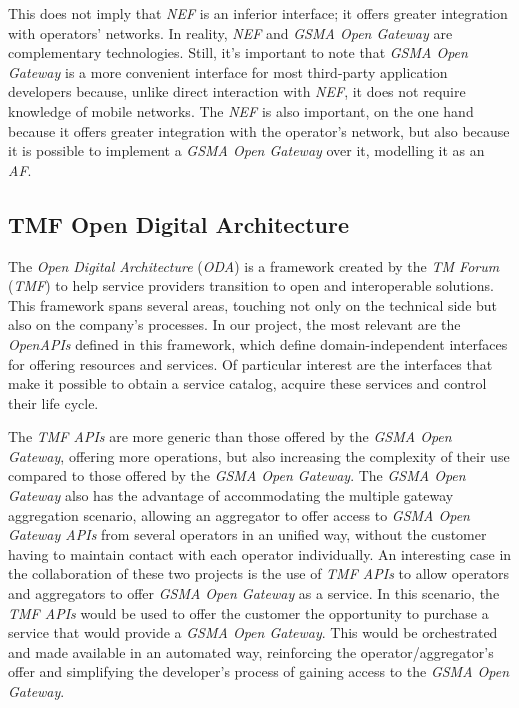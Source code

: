 This does not imply that \emph{NEF} is an inferior interface; it
offers greater integration with operators' networks. In reality,
\emph{NEF} and \emph{GSMA Open Gateway} are complementary
technologies. Still, it's important to note that \emph{GSMA Open
Gateway} is a more convenient interface for most third-party
application developers because, unlike direct interaction with
\emph{NEF},  it does not require knowledge of mobile networks.
The \emph{NEF} is also important, on the one hand because it
offers greater integration with the operator's network, but also
because it is possible to implement a \emph{GSMA Open Gateway}
over it, modelling it as an \emph{AF}.

\subsection{TMF Open Digital Architecture}

The \emph{Open Digital Architecture} (\emph{ODA}) is a framework
created by the \emph{TM Forum} (\emph{TMF}) to help service
providers transition to open and interoperable solutions. This
framework spans several areas, touching not only on the technical
side but also on the company's processes. In our project, the
most relevant are the \emph{OpenAPIs} defined in this framework,
which define domain-independent interfaces for offering resources
and services. Of particular interest are the interfaces that make
it possible to obtain a service catalog, acquire these services
and control their life cycle.

The \emph{TMF APIs} are more generic than those offered by the
\emph{GSMA Open Gateway}, offering more operations, but also
increasing the complexity of their use compared to those offered
by the \emph{GSMA Open Gateway}. The \emph{GSMA Open Gateway}
also has the advantage of accommodating the multiple gateway
aggregation scenario, allowing an aggregator to offer access to
\emph{GSMA Open Gateway APIs} from several operators in an unified
way, without the customer having to maintain contact with each
operator individually. An interesting case in the collaboration
of these two projects is the use of \emph{TMF APIs} to allow
operators and aggregators to offer \emph{GSMA Open Gateway} as a
service. In this scenario, the \emph{TMF APIs} would be used to
offer the customer the opportunity to purchase a service that
would provide a \emph{GSMA Open Gateway}. This would be
orchestrated and made available in an automated way, reinforcing
the operator/aggregator's offer and simplifying the developer's
process of gaining access to the \emph{GSMA Open Gateway}.


